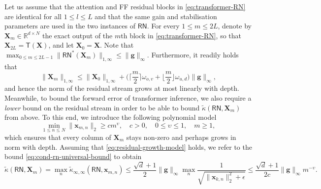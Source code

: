 \documentclass[namedate,webpdf,imanum]{ima-authoring-template}
\newcommand{\Real}{\mathbb{R}}
\newcommand{\Matrix}[1]{\mathbf{#1}}
\newcommand{\Norm}[3][]{#1\| #2 #1\|_{\mathrm{#3}}}
\newcommand{\Layer}[1]{\mathsf{#1}}
\newcommand{\condabs}[3][]{\tilde{\kappa}_{\mathrm{#2}} #1( #3 #1)}
\numberwithin{equation}{section}
\begin{document}
Let us assume that the attention and FF residual blocks in \eqref{eq:transformer-RN} are identical for all $1 \leq l \leq L$ and that the same gain and stabilisation parameters are used in the two instances of $\Layer{RN}$.
For every $1 \leq m \leq 2L$, denote by $\Matrix{X}_m \in \Real^{d \times N}$ the exact output of the $m$th block in \eqref{eq:transformer-RN}, so that $\Matrix{X}_{2L} = \Layer{T}(\Matrix{X})$, and let $\Matrix{X}_0 = \Matrix{X}$.
Note that $\max_{0 \leq m \leq 2L - 1} \Norm{\Layer{RN}^*(\Matrix{X}_m)}{1,\infty} \leq \Norm{\Matrix{g}}{\infty}$.
Furthermore, it readily holds that
\begin{equation*}
    \Norm{\Matrix{X}_m}{1,\infty} \leq \Norm{\Matrix{X}_0}{1,\infty} + \Big( \Big\lceil \frac{m}{2} \Big\rceil \omega_{o,v} + \Big\lfloor \frac{m}{2} \Big\rfloor \omega_{u,d} \Big) \Norm{\Matrix{g}}{\infty},
\end{equation*}
and hence the norm of the residual stream grows at most linearly with depth.
Meanwhile, to bound the forward error of transformer inference, we also require a \emph{lower} bound on the residual stream in order to be able to bound $\tilde{\kappa}(\Layer{RN}, \Matrix{X}_m)$ from above.
To this end, we introduce the following polynomial model
\begin{equation}
\label{eq:residual-growth-model}
    \min_{1 \leq n \leq N} \Norm{\Matrix{x}_{m,n}}{2} \geq c m^{\upsilon}, \quad c > 0, \quad 0 \leq \upsilon \leq 1, \quad m \geq 1,
\end{equation}
which ensures that every column of $\Matrix{X}_m$ stays non-zero and perhaps grows in norm with depth.
Assuming that \eqref{eq:residual-growth-model} holds, we refer to the bound \eqref{eq:cond-rn-universal-bound} to obtain
\begin{equation*}
    \tilde{\kappa}(\Layer{RN}, \Matrix{X}_m) = \max_n \condabs{\infty,\infty}{\Layer{RN}, \Matrix{x}_{m,n}} \leq \frac{\sqrt{d} + 1}{2} \Norm{\Matrix{g}}{\infty} \max_n \frac{1}{\sqrt{\Norm{\Matrix{x}_{k,n}}{2}^2 + \epsilon}} \leq \frac{\sqrt{d} + 1}{2c} \Norm{\Matrix{g}}{\infty} m^{-\upsilon}.
\end{equation*}
\end{document}
